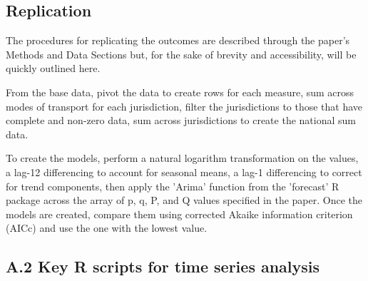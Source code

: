 \documentclass[11pt]{article}
\begin{document}
\subsection*{Replication}

The procedures for replicating the outcomes are described through the paper's Methods and Data Sections but, for the sake of brevity and accessibility, will be quickly outlined here. 

From the base data, pivot the data to create rows for each measure, sum across modes of transport for each jurisdiction, filter the jurisdictions to those that have complete and non-zero data, sum across jurisdictions to create the national sum data. 

To create the models, perform a natural logarithm transformation on the values, a lag-12 differencing to account for seasonal means, a lag-1 differencing to correct for trend components, then apply the 'Arima' function from the 'forecast' R package across the array of p, q, P, and Q values specified in the paper. Once the models are created, compare them using corrected Akaike information criterion (AICc) and use the one with the lowest value. 

\subsection*{A.2 Key R scripts for time series analysis}
\end{document}
